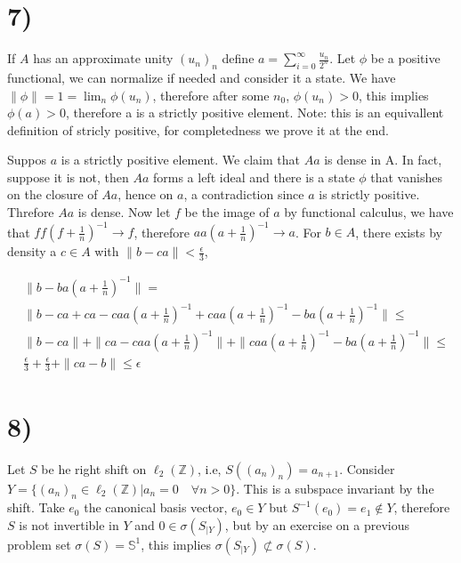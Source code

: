\documentclass{article}
\begin{document}
 \section*{7)}

 If $A$ has an approximate unity $(u_n)_n$ define $a=\sum_{i=0}^\infty 
 \frac{u_n}{2^n}$. Let $\phi$ be a positive functional, we can normalize if 
 needed and consider it a state. We have $\|\phi\|=1=\lim_n \phi (u_n)$,
 therefore after some $n_0$, $\phi(u_n)>0$, this implies $\phi(a)>0$, therefore
 a is a strictly positive element. Note: this is an equivallent definition
 of stricly positive, for completedness we prove it at the end.

 Suppos $a$ is a strictly positive element. We claim that $Aa$ is dense in A.
 In fact, suppose it is not, then $Aa$ forms a left ideal and there is a 
 state $\phi$ that vanishes on the closure of $Aa$, hence on $a$, a contradiction
 since $a$ is strictly positive. Threfore $Aa$ is dense. Now let $f$ be the 
 image of $a$ by functional calculus, we have that $ff(f+ \frac{1}{n})^{-1}\to f$,
 therefore $aa(a+\frac{1}{n})^{-1}\to a$. For $b\in A$, there exists by density
 a $c\in A$ with $\|b-ca\|<\frac{\epsilon}{3}$,

 \begin{align*}
    &\|b-ba(a+\frac{1}{n})^{-1}\|=  \\ &\|b-ca+ca -caa(a+\frac{1}{n})^{-1}
    +caa(a+\frac{1}{n})^{-1}-ba(a+\frac{1}{n})^{-1}\|\leq \\
    &\|b-ca\|+\|ca -caa(a+\frac{1}{n})^{-1}\|+ \|caa(a+\frac{1}{n})^{-1}-ba(a+\frac{1}{n})^{-1} \|\leq \\
    &\frac{\epsilon}{3}+ \frac{\epsilon}{3} + \|ca-b\|\leq \epsilon 
 \end{align*}



 \section*{8)}

 Let $S$ be he right shift on $\ell_2(\mathbb{Z})$, i.e, $S((a_n)_n)=a_{n+1}$.
 Consider $Y=\{(a_n)_n\in \ell_2(\mathbb{Z})|a_n=0\quad  \forall n>0\}$. This is 
 a subspace invariant by the shift. Take $e_0$ the canonical basis vector, $e_0\in Y$
 but $S^{-1}(e_0)= e_1\notin Y$, therefore $S$ is not invertible in $Y$ and
 $0\in \sigma(S_{|Y})$, but by an exercise on a previous problem set 
 $\sigma(S)=\mathbb{S}^1$, this implies $\sigma(S_{|Y})\not\subset \sigma(S)$.
\end{document}
